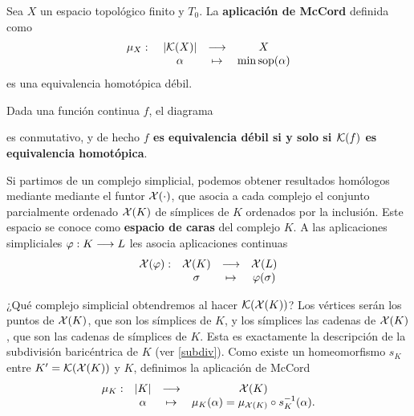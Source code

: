 \begin{theorem}
  Sea $ X $ un espacio topológico finito y $ T_0 $. La \textbf{aplicación de McCord} definida como 
  \begin{gather*}
    \begin{matrix}
    \mu_X: \ &\abs{\mathcal{K}(X)} &\longrightarrow &X \\
    &\alpha  &\mapsto &\min \operatorname{sop} (\alpha )
    \end{matrix}  
  \end{gather*}
  es una equivalencia homotópica débil.
\end{theorem}

\begin{observation}
  Dada una función continua $f$, el diagrama 
\begin{center}
\end{center}
es conmutativo, y de hecho  \textbf{$f$ es equivalencia débil si y solo si $\mathcal{K}(f)$ es equivalencia homotópica}.
\end{observation}

Si partimos de un complejo simplicial, podemos obtener resultados homólogos mediante mediante el funtor $\mathcal{X}(\cdot)$, que asocia a cada complejo el conjunto parcialmente ordenado $\mathcal{X}(K)$ de símplices de $K$ ordenados por la inclusión. Este espacio se conoce como \textbf{espacio de caras} del complejo $K$. A las aplicaciones simpliciales $\varphi:K\longrightarrow L $ les asocia aplicaciones continuas 
\begin{gather*}
    \begin{matrix*}
        \xcal(\vf):&\xcal(K)&\lra &\xcal(L) \\ 
        &\sigma &\mapsto & \vf(\sigma)
    \end{matrix*}
\end{gather*}

¿Qué complejo simplicial obtendremos al hacer $\mathcal{K}(\mathcal{X}(K))$? Los vértices serán los puntos de $\mathcal{X}(K)$, que son los símplices de $K$, y los símplices las cadenas de $\mathcal{X}(K)$, que son las cadenas de símplices de $K$. Esta es exactamente la descripción de la subdivisión baricéntrica de $K$ (ver \ref{subdiv}). Como existe un homeomorfismo $s_K$ entre $K'= \mathcal{K}(\mathcal{X}(K))   $ y $K$, definimos la aplicación de McCord
\begin{gather*}\label{apmccord2}
    \begin{matrix}
        \mu_K:&\abs{K}&\longrightarrow &\mathcal{X}(K) \\ 
        &\alpha &\mapsto & \mu_K(\alpha) = \mu_{\mathcal{X}(K)}\circ s_K^{-1} (\alpha).
    \end{matrix}
\end{gather*}

